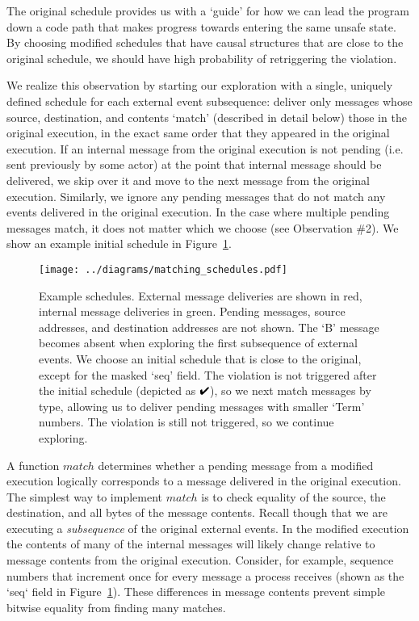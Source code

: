  The original schedule
provides us with a
`guide' for how we can lead the program down a code path that makes progress towards
entering the same unsafe state. By choosing modified schedules that have causal
structures that are close to the original schedule, we should have high
probability of retriggering the violation.

We realize this observation by starting our exploration with a single, uniquely
defined schedule for each external event subsequence: deliver only messages
whose source, destination, and contents
`match' (described in detail below) those in the original execution, in the exact same order
that they appeared in the original execution. If an internal message from the
original execution is not pending (i.e. sent previously by some actor) at the
point that internal message should be delivered, we skip over it and
move to the next message from the original execution. Similarly, we
ignore any pending messages that do not match any events delivered in the original
execution. In the case where multiple pending messages match, it does not
matter which we choose (see Observation \#2).
We show an example initial
schedule in Figure~\ref{fig:matching}.

\begin{figure}[tb!]
    \centering
    \texttt{[image: ../diagrams/matching\_schedules.pdf]}
    \caption{\label{fig:matching} Example schedules. External
    message deliveries are shown in red, internal message deliveries in green. Pending
    messages, source addresses, and destination addresses are not shown. The `B' message
    becomes absent when exploring the first subsequence of external
    events. We choose an initial schedule that is close to the original,
    except for the masked `seq' field. The violation is not triggered after
    the initial schedule (depicted as $\PASS$), so we next match messages by type,
    allowing us to deliver pending messages with smaller `Term' numbers. The violation is still not triggered, so we continue exploring.}
\end{figure}


 A function $match$ determines whether a
pending message from a modified execution logically corresponds to a
message delivered in the original execution. The simplest way to implement
$match$ is to
check equality of the source, the destination, and all bytes of the message
contents. Recall though that we are executing a
{\em subsequence} of the original external events.
In the modified execution the contents of many of the
internal messages will likely change relative to message contents from the original execution. Consider, for example, sequence numbers
that increment once for every message a process receives (shown as the `seq` field in Figure~\ref{fig:matching}). These differences in
message contents prevent simple bitwise equality from finding
many matches.

